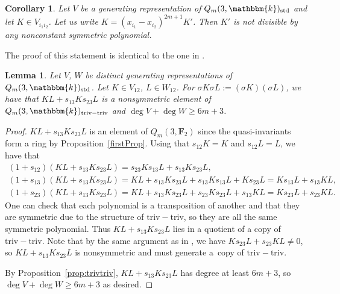 \documentclass[pdftex]{sigma}
\newtheorem{Corollary}[Theorem]{Corollary}
\newtheorem{Lemma}[Theorem]{Lemma}
\theoremstyle{definition}
\numberwithin{equation}{section}
\renewcommand{\k}{\mathbbm{k}}
\newcommand{\std}{\mathrm{std}}
\newcommand{\trtr}{\mathrm{triv-triv}}
\begin{document}
\begin{Corollary}
 Let $V$ be a generating representation of $Q_m(3,\k)_\std$ and let $K\in V_{i_1i_2}$. Let us write $K=(x_{i_1}-x_{i_2})^{2m+1}K'$. Then $K'$ is not divisible by any nonconstant symmetric polynomial.
\end{Corollary}

The proof of this statement is identical to the one in \cite{wang2022explicit}.

\begin{Lemma}\label{char3.4}
 Let $V$, $W$ be distinct generating representations of $Q_m(3,\k)_\std$. Let ${K\in V_{12}}$, ${L\in W_{12}}$. For $\sigma K\sigma L:=(\sigma K)(\sigma L)$, we have that $KL+s_{13}Ks_{23}L$ is a nonsymmetric element of $Q_m(3,\k)_\trtr$ and $\deg V+\deg W\geq 6m+3$.
\end{Lemma}
\begin{proof}
 $KL+s_{13}Ks_{23}L$ is an element of $Q_m(3,\mathbf{F}_2)$ since the quasi-invariants form a ring by Proposition~\ref{firstProp}. Using that $s_{12}K=K$ and $s_{12}L=L$, we have that
 \begin{gather*}
 (1+s_{12})(KL+s_{13}Ks_{23}L) = s_{23}Ks_{13}L+s_{13}Ks_{23}L,\\
 (1+s_{13})(KL+s_{13}Ks_{23}L) = KL+s_{13}Ks_{23}L+s_{13}Ks_{13}L + Ks_{23}L = Ks_{13}L+s_{13}KL,\\
 (1+s_{23})(KL+s_{13}Ks_{23}L) = KL+s_{13}Ks_{23}L+s_{23}Ks_{23}L + s_{13}KL = Ks_{23}L+s_{23}KL.
 \end{gather*}
 One can check that each polynomial is a transposition of another and that they are symmetric due to the structure of $\trtr$, so they are all the same symmetric polynomial. Thus ${KL+s_{13}Ks_{23}L}$ lies in a quotient of a copy of $\trtr$. Note that by the same argument as in \cite{wang2022explicit}, we have $Ks_{23}L+s_{23}KL\neq 0$, so $KL+s_{13}Ks_{23}L$ is nonsymmetric and must generate a~copy of $\trtr$.

 By Proposition~\ref{prop:trivtriv}, $KL+s_{13}Ks_{23}L$ has degree at least $6m+3$, so $\deg V+\deg W\geq 6m+3$ as desired.
\end{proof}
\end{document}
